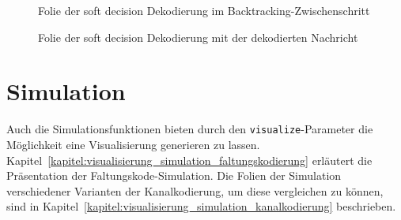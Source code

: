 \begin{figure}[th]
	\centering
	\caption{Folie der soft decision Dekodierung im Backtracking-Zwischenschritt}
	\label{abb:folie_dekodierung_3}
\end{figure}
\begin{figure}[th]
	\centering
	\caption{Folie der soft decision Dekodierung mit der dekodierten Nachricht}
	\label{abb:folie_dekodierung_4}
\end{figure}

\section{Simulation}
\label{kapitel:visualisierung_simulation}
Auch die Simulationsfunktionen bieten durch den \texttt{visualize}-Parameter die Möglichkeit eine Visualisierung generieren zu lassen. Kapitel~\ref{kapitel:visualisierung_simulation_faltungskodierung} erläutert die Präsentation der Faltungskode-Simulation. Die Folien der Simulation verschiedener Varianten der Kanalkodierung, um diese vergleichen zu können, sind in Kapitel~\ref{kapitel:visualisierung_simulation_kanalkodierung} beschrieben.


